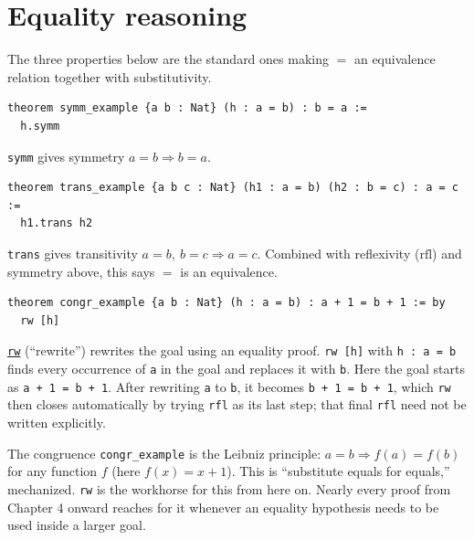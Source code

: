\section{Equality reasoning}\label{sec:03-propositions-and-proofs:07-equality:1}

The three properties below are the standard ones making \(=\) an equivalence relation together with substitutivity.

\begin{lstlisting}
theorem symm_example {a b : Nat} (h : a = b) : b = a :=
  h.symm
\end{lstlisting}

\texttt{symm} gives symmetry \(a = b \Rightarrow b = a\).

\begin{lstlisting}
theorem trans_example {a b c : Nat} (h1 : a = b) (h2 : b = c) : a = c :=
  h1.trans h2
\end{lstlisting}

\texttt{trans} gives transitivity \(a = b,\ b = c \Rightarrow a = c\). Combined with reflexivity (\(\mathrm{rfl}\)) and symmetry above, this says \(=\) is an equivalence.

\begin{lstlisting}
theorem congr_example {a b : Nat} (h : a = b) : a + 1 = b + 1 := by
  rw [h]
\end{lstlisting}

\href{https://lean-lang.org/doc/reference/latest/Tactic-Proofs/Tactic-Reference/}{\texttt{rw}} (``rewrite'') rewrites the goal using an equality proof. \texttt{rw [h]} with \texttt{h : a = b} finds every occurrence of \texttt{a} in the goal and replaces it with \texttt{b}. Here the goal starts as \texttt{a + 1 = b + 1}. After rewriting \texttt{a} to \texttt{b}, it becomes \texttt{b + 1 = b + 1}, which \texttt{rw} then closes automatically by trying \texttt{rfl} as its last step; that final \texttt{rfl} need not be written explicitly.

The congruence \texttt{congr\_\allowbreak{}example} is the Leibniz principle: \(a = b \Rightarrow f(a) = f(b)\) for any function \(f\) (here \(f(x) = x + 1\)). This is ``substitute equals for equals,'' mechanized. \texttt{rw} is the workhorse for this from here on. Nearly every proof from Chapter 4 onward reaches for it whenever an equality hypothesis needs to be used inside a larger goal.
